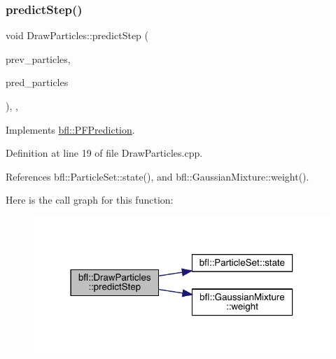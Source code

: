 \mbox{\label{classbfl_1_1DrawParticles_a36deaed86f1146431cacefa23f0445d0}} 
\subsubsection{\texorpdfstring{predict\+Step()}{predictStep()}}
{\footnotesize\ttfamily void Draw\+Particles\+::predict\+Step (\begin{DoxyParamCaption}\item[{const \mbox{\hyperlink{classbfl_1_1ParticleSet}{Particle\+Set}} \&}]{prev\+\_\+particles,  }\item[{\mbox{\hyperlink{classbfl_1_1ParticleSet}{Particle\+Set}} \&}]{pred\+\_\+particles }\end{DoxyParamCaption})\hspace{0.3cm}{\ttfamily [override]}, {\ttfamily [protected]}, {\ttfamily [virtual]}}



Implements \mbox{\hyperlink{classbfl_1_1PFPrediction_ade49953e2beed6d12f9716254ccbba71}{bfl\+::\+P\+F\+Prediction}}.



Definition at line 19 of file Draw\+Particles.\+cpp.



References bfl\+::\+Particle\+Set\+::state(), and bfl\+::\+Gaussian\+Mixture\+::weight().

Here is the call graph for this function\+:
\nopagebreak
\begin{figure}[H]
\begin{center}
\leavevmode
\includegraphics[width=318pt]{classbfl_1_1DrawParticles_a36deaed86f1146431cacefa23f0445d0_cgraph}
\end{center}
\end{figure}
\mbox{\label{classbfl_1_1PFPrediction_ada843698204584e97d4ff6728c8e8264}} 
